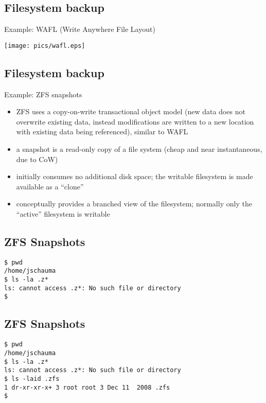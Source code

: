 \documentclass[xga]{xdvislides}
\begin{document}
\subsection{Filesystem backup}
Example: WAFL (Write Anywhere File Layout)
\vspace*{\fill}
\begin{center}
	\texttt{[image: pics/wafl.eps]}
\end{center}
\vspace*{\fill}


\subsection{Filesystem backup}
Example: ZFS snapshots
\begin{itemize}
	\item ZFS uses a copy-on-write transactional object model (new data does
		not overwrite existing data, instead modifications are written to a
		new location with existing data being referenced), similar to WAFL
	\item a snapshot is a read-only copy of a file system (cheap and near
		instantaneous, due to CoW)
	\item initially consumes no additional disk space; the writable filesystem
		is made available as a ``clone''
	\item conceptually provides a branched view of the filesystem; normally
		only the ``active'' filesystem is writable
\end{itemize}

\subsection{ZFS Snapshots}
\newcommand{\smallish}{\fontsize{15}{20}\selectfont}
\smallish
\begin{verbatim}
$ pwd
/home/jschauma
$ ls -la .z*
ls: cannot access .z*: No such file or directory
$
\end{verbatim}
\Normalsize

\subsection{ZFS Snapshots}
\smallish
\begin{verbatim}
$ pwd
/home/jschauma
$ ls -la .z*
ls: cannot access .z*: No such file or directory
$ ls -laid .zfs
1 dr-xr-xr-x+ 3 root root 3 Dec 11  2008 .zfs
$
\end{verbatim}
\Normalsize
\end{document}
